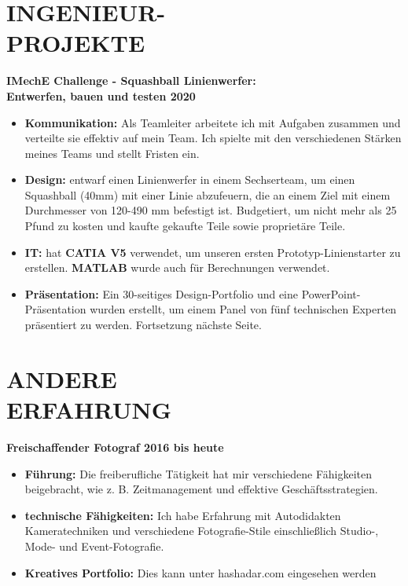 \documentclass[margin, 10pt]{res} %
\begin{document}
\begin{resume}

\section{INGENIEUR- \\ PROJEKTE}

\textbf{IMechE Challenge - Squashball Linienwerfer: \\Entwerfen, bauen und testen \hfill 2020}
\\
\begin{itemize}
  \item \textbf{Kommunikation:} 
  Als Teamleiter arbeitete ich mit Aufgaben zusammen und verteilte sie effektiv auf mein Team. Ich spielte mit den verschiedenen Stärken meines Teams und stellt Fristen ein.  
  \item \textbf{Design:} entwarf einen Linienwerfer in einem Sechserteam, um einen Squashball (40\si{\milli \meter}) mit einer Linie abzufeuern, die an einem Ziel mit einem Durchmesser von 120-490 \si{\milli \meter} befestigt ist. Budgetiert, um nicht mehr als 25 Pfund zu kosten und kaufte gekaufte Teile sowie proprietäre Teile.
  \item \textbf{IT:} hat \textbf{CATIA V5} verwendet, um unseren ersten Prototyp-Linienstarter zu erstellen. \textbf{MATLAB} wurde auch für Berechnungen verwendet.
  \item \textbf{Präsentation:} Ein 30-seitiges Design-Portfolio und eine PowerPoint-Präsentation wurden erstellt, um einem Panel von fünf technischen Experten präsentiert zu werden. Fortsetzung nächste Seite.
\end{itemize}
 
 
\section{ANDERE \\ ERFAHRUNG}
\textbf{Freischaffender Fotograf \hfill 2016 bis heute}
\\
\begin{itemize}
  \item \textbf{Führung:} Die freiberufliche Tätigkeit hat mir verschiedene Fähigkeiten beigebracht, wie z. B. Zeitmanagement und effektive Geschäftsstrategien.
  \item \textbf{technische Fähigkeiten:} Ich habe Erfahrung mit Autodidakten Kameratechniken und verschiedene Fotografie-Stile einschließlich Studio-, Mode- und Event-Fotografie.
  \item \textbf{Kreatives Portfolio:} Dies kann unter hashadar.com eingesehen werden
\end{itemize}


\end{resume}
\end{document}
